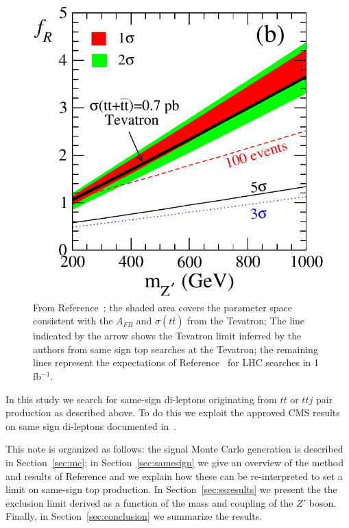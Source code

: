 \begin{figure}[htb]
\begin{center}
\includegraphics[width=0.6\linewidth]{figs/berger_limit.pdf}
\caption{\protect From Reference~\cite{berger}; the shaded area covers the parameter
space consistent with the $A_{FB}$ and $\sigma(t\bar{t})$ from the Tevatron;
The line indicated by the arrow shows the Tevatron limit inferred by the authors
from same sign top searches at the Tevatron; the remaining lines represent the
expectations of Reference~\cite{berger}
for LHC searches in 1 fb$^{-1}$. \label{fig:berger_limit}}
\end{center}
\end{figure}




In this study we search for same-sign di-leptons originating from $tt$ 
or $ttj$ pair production as described above.
To do this we exploit the approved CMS results on same sign di-leptons documented in~\cite{ssnote1, sspaper}.

This note is organized as follows: 
the signal Monte Carlo generation is described in Section~\ref{sec:mc};
in Section~\ref{sec:samesign} we give an overview of the method and results of Reference \cite{sspaper}
and we explain how these can be re-interpreted to set a limit on same-sign top production.
In Section~\ref{sec:ssresults} we present the the exclusion limit derived 
as a function of the mass and coupling of the $Z'$ boson.
Finally, in Section~\ref{sec:conclusion} we summarize the results.  







